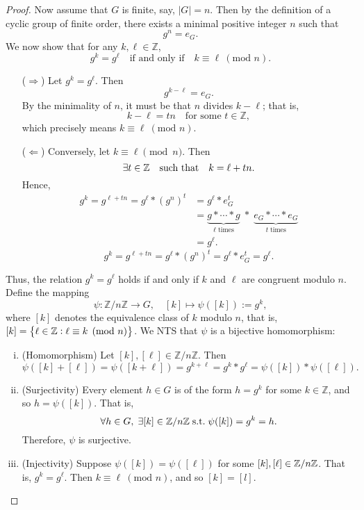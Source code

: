 \documentclass[11pt,openany]{article}
\begin{document}
\begin{proof}
	Now assume that \(G\) is finite, say, \(|G|=n\). Then by the definition of a cyclic group of finite order, there exists a minimal positive integer \(n\) such that
\[
g^n = e_G.
\]
We now show that for any \(k,\ell\in \mathbb{Z}\), \[
g^k = g^\ell \quad \text{if and only if} \quad k\equiv \ell \ (\text{mod } n).
\] \begin{itemize}
	\item[($\Rightarrow$)] Let \(g^k = g^\ell\). Then
	\[
	g^{k-\ell}=e_G.
	\]
	By the minimality of \(n\), it must be that \(n\) divides \(k-\ell\); that is,
	\[
	k-\ell = tn \quad \text{for some } t\in \mathbb{Z},
	\]
	which precisely means \(k\equiv \ell \ (\text{mod } n)\).
	\item[($\Leftarrow$)] Conversely, let \(k\equiv \ell \pmod{n}\). Then \[
	\exists t\in\mathbb{Z}\quad \text{such that}\quad k = \ell + tn.
	\]
	Hence, \begin{align*}
	g^k = g^{\ell + tn} = g^\ell \ast (g^n)^t &= g^\ell \ast e_G^t\\
	&=\underbrace{g\ast\cdots\ast g}_{\ell\; \text{times}}\; \ast\; \underbrace{e_G\ast \cdots\ast e_G}_{t\; \text{times}}\\
	&=g^\ell.
	\end{align*}
	\[
	g^k = g^{\ell + tn} = g^\ell \ast (g^n)^t = g^\ell \ast e_G^t = g^\ell.
	\]
\end{itemize}
Thus, the relation \(g^k = g^\ell\) holds if and only if \(k\) and \(\ell\) are congruent modulo \(n\).
Define the mapping\[
\psi: \mathbb{Z}/n\mathbb{Z} \to G,\quad [k]\mapsto \psi([k]):=g^k,
\] where \([k]\) denotes the equivalence class of \(k\) modulo \(n\), that is, $[k]=\set{\ell\in\mathbb{Z}:\ell\equiv k \pmod{n} }$.
We NTS that \(\psi\) is a bijective homomorphism:
\begin{enumerate}[(i)]
	\item (Homomorphism)\; Let \([k],[\ell]\in \mathbb{Z}/n\mathbb{Z}\). Then
	\[
	\psi([k]+[\ell]) = \psi([k+\ell]) = g^{k+\ell} = g^k \ast g^\ell = \psi([k]) \ast \psi([\ell]).
	\]
	\item (Surjectivity)\; Every element \(h\in G\) is of the form \(h=g^k\) for some \(k\in \mathbb{Z}\), and so \(h=\psi([k])\).  That is, \[
	\forall h\in G,\; \exists [k]\in\mathbb{Z}/n\mathbb{Z}\; \text{s.t.}\; \psi([k])=g^k = h.
	\] Therefore, \(\psi\) is surjective.
	\item (Injectivity)\; Suppose \(\psi([k])=\psi([\ell])\) for some $[k],[\ell]\in\mathbb{Z}/n\mathbb{Z}$. That is, \(g^k=g^\ell\). Then \(k\equiv \ell\ (\text{mod } n)\), and so $[k]=[l]$.
\end{enumerate}

\end{proof}
\end{document}
